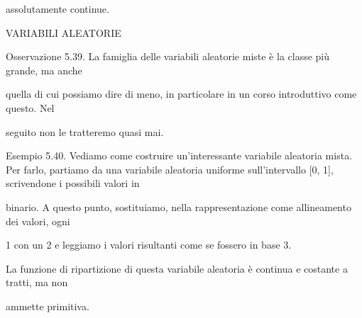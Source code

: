 \documentclass[a4paper,portrait,12pt]{article}
\begin{document}
\begin{flushleft}
assolutamente continue.
\end{flushleft}










\begin{flushleft}
VARIABILI ALEATORIE
\end{flushleft}





\begin{flushleft}
Osservazione 5.39. La famiglia delle variabili aleatorie miste \`{e} la classe più grande, ma anche
\end{flushleft}


\begin{flushleft}
quella di cui possiamo dire di meno, in particolare in un corso introduttivo come questo. Nel
\end{flushleft}


\begin{flushleft}
seguito non le tratteremo quasi mai.
\end{flushleft}


\begin{flushleft}
Esempio 5.40. Vediamo come costruire un'interessante variabile aleatoria mista. Per farlo, partiamo da una variabile aleatoria uniforme sull'intervallo [0, 1], scrivendone i possibili valori in
\end{flushleft}


\begin{flushleft}
binario. A questo punto, sostituiamo, nella rappresentazione come allineamento dei valori, ogni
\end{flushleft}


\begin{flushleft}
1 con un 2 e leggiamo i valori risultanti come se fossero in base 3.
\end{flushleft}


\begin{flushleft}
La funzione di ripartizione di questa variabile aleatoria \`{e} continua e costante a tratti, ma non
\end{flushleft}


\begin{flushleft}
ammette primitiva.
\end{flushleft}
\end{document}
